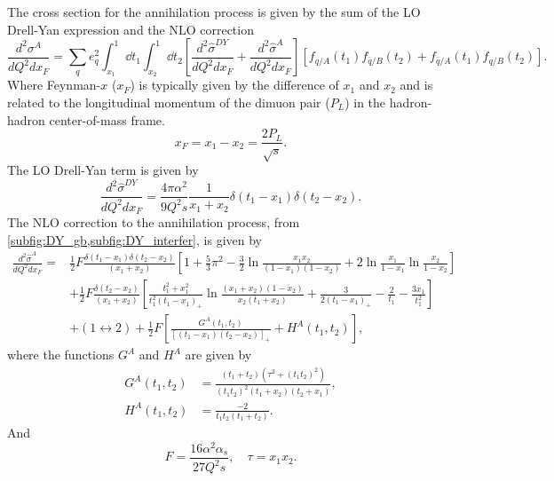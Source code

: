 The cross section for the annihilation process is given by the sum of the LO Drell-Yan expression and
the NLO correction~\cite{kubar1980}
\begin{equation}
	\frac{d^2\sigma^A}{dQ^2dx_{F}} = \sum_q e^2_q \int^1_{x_1} \dd{t_1} \int^1_{x_2} \dd{t_2}
	\left[ \frac{d^2\hat{\sigma}^{DY}}{dQ^2dx_F}+\frac{d^2\hat{\sigma}^{A}}{dQ^2dx_F} \right]
	\left[f_{q/A}\left(t_1\right)f_{\bar{q}/B}\left(t_2\right) +
	f_{\bar{q}/A}\left(t_1\right)f_{q/B}\left(t_2\right)
	\right].
\end{equation}
Where Feynman-$x$ ($x_F$) is typically given by the difference of $x_1$ and $x_2$ and is related to the
longitudinal momentum of the dimuon pair ($P_L$) in the hadron-hadron center-of-mass frame.
\begin{equation}
	x_F = x_1 - x_2 = \frac{2P_L}{\sqrt{s}}.
\end{equation}
The LO Drell-Yan term is given by
\begin{equation}
	\frac{ d^2\hat{\sigma}^{DY} }{dQ^2 dx_F} = \frac{4\pi\alpha^2}{9Q^2 s} \frac{1}{x_1+x_2}\delta\left(t_1-x_1\right)\delta\left(t_2-x_2\right).
\end{equation}
The NLO correction to the annihilation process, from \cref{subfig:DY_gb,subfig:DY_interfer},
is given by
\begin{equation}
\begin{split}
	\frac{d^2\hat{\sigma}^{A}}{dQ^2dx_F} =& \frac{1}{2}F \frac{\delta\left(t_1-x_1\right)\delta\left(t_2-x_2\right)}{\left(x_1+x_2\right)} \left[ 1+\frac{5}{3}\pi^2 - \frac{3}{2}\ln\frac{x_1x_2}{\left(1-x_1\right)\left(1-x_2\right)} + 2\ln\frac{x_1}{1-x_1}\ln\frac{x_2}{1-x_2}\right]\\
	&+\frac{1}{2} F \frac{\delta\left(t_2-x_2\right)}{\left(x_1+x_2\right)}\left[\frac{t_1^2+x_1^2}{t_1^2\left(t_1-x_1\right)_{+}} \ln\frac{\left(x_1+x_2\right)\left(1-x_2\right)}{x_2\left(t_1+x_2\right)} + \frac{3}{2\left(t_1-x_1\right)_{+}} -\frac{2}{t_1} - \frac{3x_1}{t_1^2}\right]\\
	&+\left(1\leftrightarrow 2\right) + \frac{1}{2} F \left[\frac{G^A\left(t_1,t_2\right)}{\left[\left(t_1-x_1\right)\left(t_2-x_2\right)\right]_{+}} +H^A\left(t_1,t_2\right)\right],
\end{split}
\end{equation}
where the functions $G^A$ and $H^A$ are given by
\begin{align}
	G^A\left(t_1,t_2\right) &= \frac{\left(t_1+t_2\right)\left(\tau^2+\left(t_1t_2\right)^2\right)}{\left(t_1t_2\right)^2\left(t_1+x_2\right)\left(t_2+x_1\right)},\\
	H^A\left(t_1,t_2\right) &= \frac{-2}{t_1t_2\left(t_1+t_2\right)}.
\end{align}
And
\begin{equation}
	F=\frac{16\alpha^2\alpha_s}{27Q^2s}, \quad \tau=x_1x_2.
\end{equation}

